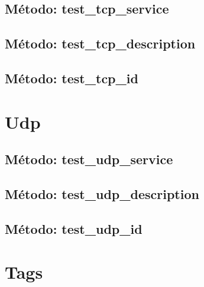 

\subsection{\quad Método: test\_tcp\_service}



\subsection{\quad Método: test\_tcp\_description}



\subsection{\quad Método: test\_tcp\_id}



\section{\quad Udp}



\subsection{\quad Método: test\_udp\_service}



\subsection{\quad Método: test\_udp\_description}



\subsection{\quad Método: test\_udp\_id}



\section{\quad Tags}

